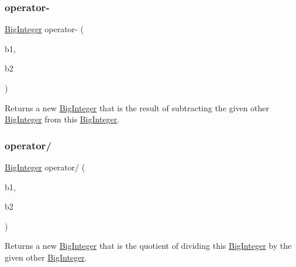 \mbox{\label{classBigInteger_ade6e91641d142240dc488b015c75504e}} 
\subsubsection{\texorpdfstring{operator-\/}{operator-}}
{\footnotesize\ttfamily \mbox{\hyperlink{classBigInteger}{Big\+Integer}} operator-\/ (\begin{DoxyParamCaption}\item[{const \mbox{\hyperlink{classBigInteger}{Big\+Integer}} \&}]{b1,  }\item[{const \mbox{\hyperlink{classBigInteger}{Big\+Integer}} \&}]{b2 }\end{DoxyParamCaption})\hspace{0.3cm}{\ttfamily [friend]}}



Returns a new \mbox{\hyperlink{classBigInteger}{Big\+Integer}} that is the result of subtracting the given other \mbox{\hyperlink{classBigInteger}{Big\+Integer}} from this \mbox{\hyperlink{classBigInteger}{Big\+Integer}}. 

\mbox{\label{classBigInteger_aa472efac72a9e7c868073119accefe94}} 
\subsubsection{\texorpdfstring{operator/}{operator/}}
{\footnotesize\ttfamily \mbox{\hyperlink{classBigInteger}{Big\+Integer}} operator/ (\begin{DoxyParamCaption}\item[{const \mbox{\hyperlink{classBigInteger}{Big\+Integer}} \&}]{b1,  }\item[{const \mbox{\hyperlink{classBigInteger}{Big\+Integer}} \&}]{b2 }\end{DoxyParamCaption})\hspace{0.3cm}{\ttfamily [friend]}}



Returns a new \mbox{\hyperlink{classBigInteger}{Big\+Integer}} that is the quotient of dividing this \mbox{\hyperlink{classBigInteger}{Big\+Integer}} by the given other \mbox{\hyperlink{classBigInteger}{Big\+Integer}}. 


